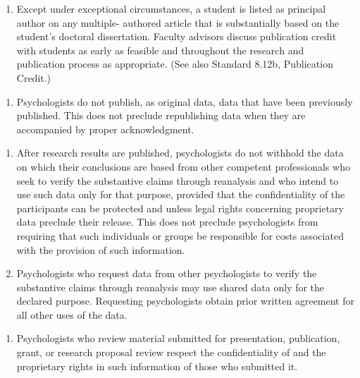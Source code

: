 \begin{fullwidth}
\begin{enumerate}
\item Except under exceptional circumstances, a student is listed as principal author on any multiple- authored article that is substantially based on the student's doctoral dissertation. Faculty advisors discuss publication credit with students as early as feasible and throughout the research and publication process as appropriate. (See also Standard 8.12b, Publication Credit.)

\end{enumerate}





\begin{enumerate}

\item Psychologists do not publish, as original data, data that have been previously published. This does not preclude
republishing data when they are accompanied by proper acknowledgment. 

\end{enumerate}




\begin{enumerate}

\item After research results are published, psychologists do not withhold the data on which their conclusions are based from other competent professionals who seek to verify the substantive claims through reanalysis and who intend to use such data only for that purpose, provided that the confidentiality of the participants can be protected and unless legal rights concerning proprietary data preclude their release. This does not preclude psychologists from requiring that such individuals or groups be responsible for costs associated with the provision of such information.


\item Psychologists who request data from other psychologists to verify the substantive claims through reanalysis may use shared data only for the declared purpose. Requesting psychologists obtain prior written agreement for all other uses of the data.

\end{enumerate}




\begin{enumerate}

\item Psychologists who review material submitted for presentation, publication, grant, or research proposal review
respect the confidentiality of and the proprietary rights in such information of those who submitted it.

\end{enumerate}


\end{fullwidth}




